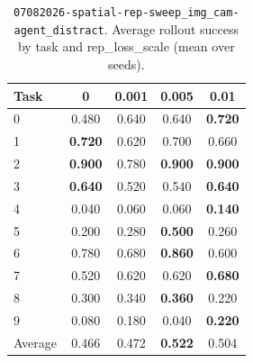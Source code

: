 \begin{table}
\caption{\texttt{07082026-spatial-rep-sweep\_img\_cam-agent\_distract}. Average rollout success by task and rep\_loss\_scale (mean over seeds).}
\label{tab:07082026_spatial_rep_sweep_img_cam_agent_distract_rep_loss_success}
\begin{tabular}{lcccc}
\toprule
Task & 0 & 0.001 & 0.005 & 0.01 \\
\midrule
0 & 0.480 & 0.640 & 0.640 & \textbf{0.720} \\
1 & \textbf{0.720} & 0.620 & 0.700 & 0.660 \\
2 & \textbf{0.900} & 0.780 & \textbf{0.900} & \textbf{0.900} \\
3 & \textbf{0.640} & 0.520 & 0.540 & \textbf{0.640} \\
4 & 0.040 & 0.060 & 0.060 & \textbf{0.140} \\
5 & 0.200 & 0.280 & \textbf{0.500} & 0.260 \\
6 & 0.780 & 0.680 & \textbf{0.860} & 0.600 \\
7 & 0.520 & 0.620 & 0.620 & \textbf{0.680} \\
8 & 0.300 & 0.340 & \textbf{0.360} & 0.220 \\
9 & 0.080 & 0.180 & 0.040 & \textbf{0.220} \\
\midrule
Average & 0.466 & 0.472 & \textbf{0.522} & 0.504 \\
\bottomrule
\end{tabular}
\end{table}




